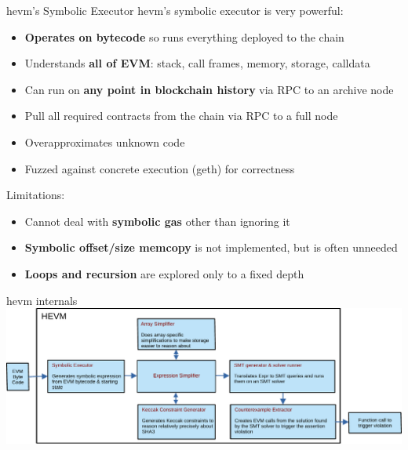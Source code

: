 \documentclass[aspectratio=169]{beamer}
\begin{document}
\begin{frame}{hevm's Symbolic Executor}
hevm's symbolic executor is very powerful:
\begin{itemize}
\item \textbf{Operates on bytecode} so runs everything deployed to the chain
\item Understands \textbf{all of EVM}: stack, call frames, memory, storage, calldata
\item Can run on \textbf{any point in blockchain history} via RPC to an archive node
\item Pull all required contracts from the chain via RPC to a full node
\item Overapproximates unknown code
\item Fuzzed against concrete execution (geth) for correctness
\end{itemize}
\bigskip

Limitations:
\begin{itemize}
\item Cannot deal with \textbf{symbolic gas} other than ignoring it
\item \textbf{Symbolic offset/size memcopy} is not implemented, but is often unneeded
\item \textbf{Loops and recursion} are explored only to a fixed depth
\end{itemize}
\end{frame}

\begin{frame}{hevm internals}
\centering
\includegraphics[scale=0.6]{hevm-overview}
\end{frame}
\end{document}
